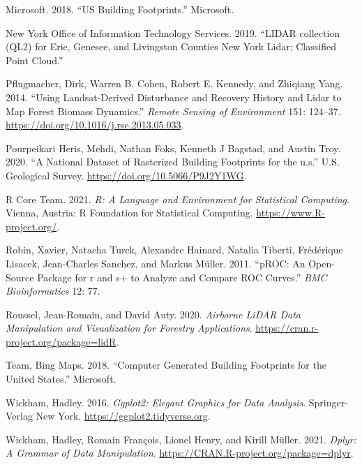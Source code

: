 \documentclass[]{elsarticle} %
\newlength{\cslhangindent}
\newenvironment{CSLReferences}[2] %
 {%
  \setlength{\parindent}{0pt}
  \ifodd #1 \everypar{\setlength{\hangindent}{\cslhangindent}}\ignorespaces\fi
  \ifnum #2 > 0
  \setlength{\parskip}{#2\baselineskip}
  \fi
 }%
 {}
\begin{document}
\begin{CSLReferences}{1}{0}
\leavevmode{}%
Microsoft. 2018. {``{US Building Footprints.}''} Microsoft.

\leavevmode{}%
New York Office of Information Technology Services. 2019. {``{LIDAR collection (QL2) for Erie, Genesee, and Livingston Counties New York Lidar; Classified Point Cloud}.''}

\leavevmode{}%
Pflugmacher, Dirk, Warren B. Cohen, Robert E. Kennedy, and Zhiqiang Yang. 2014. {``Using Landsat-Derived Disturbance and Recovery History and Lidar to Map Forest Biomass Dynamics.''} \emph{Remote Sensing of Environment} 151: 124--37. \url{https://doi.org/10.1016/j.rse.2013.05.033}.

\leavevmode{}%
Pourpeikari Heris, Mehdi, Nathan Foks, Kenneth J Bagstad, and Austin Troy. 2020. {``A National Dataset of Rasterized Building Footprints for the u.s.''} U.S. Geological Survey. \url{https://doi.org/10.5066/P9J2Y1WG}.

\leavevmode{}%
R Core Team. 2021. \emph{R: A Language and Environment for Statistical Computing}. Vienna, Austria: R Foundation for Statistical Computing. \url{https://www.R-project.org/}.

\leavevmode{}%
Robin, Xavier, Natacha Turck, Alexandre Hainard, Natalia Tiberti, Frédérique Lisacek, Jean-Charles Sanchez, and Markus Müller. 2011. {``pROC: An Open-Source Package for r and s+ to Analyze and Compare ROC Curves.''} \emph{BMC Bioinformatics} 12: 77.

\leavevmode{}%
Roussel, Jean-Romain, and David Auty. 2020. \emph{Airborne LiDAR Data Manipulation and Visualization for Forestry Applications}. \url{https://cran.r-project.org/package=lidR}.

\leavevmode{}%
Team, Bing Maps. 2018. {``{Computer Generated Building Footprints for the United States.}''} Microsoft.

\leavevmode{}%
Wickham, Hadley. 2016. \emph{Ggplot2: Elegant Graphics for Data Analysis}. Springer-Verlag New York. \url{https://ggplot2.tidyverse.org}.

\leavevmode{}%
Wickham, Hadley, Romain François, Lionel Henry, and Kirill Müller. 2021. \emph{Dplyr: A Grammar of Data Manipulation}. \url{https://CRAN.R-project.org/package=dplyr}.


\end{CSLReferences}
\end{document}
